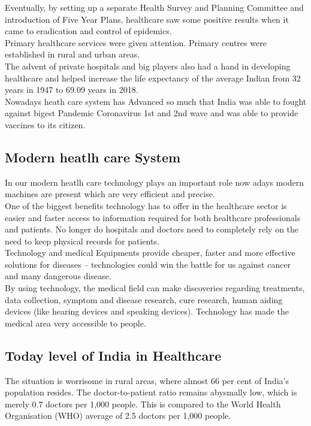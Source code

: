 \documentclass[12pt]{report}
\begin{document}
Eventually, by setting up a separate Health Survey and Planning Committee and introduction of Five Year Plans, healthcare saw some positive results when it came to eradication and control of epidemics.\\
Primary healthcare services were given attention. Primary centres were established in rural and urban areas.\\
The advent of private hospitals and big players also had a hand in developing healthcare and helped increase the life expectancy of the average Indian from 32 years in 1947 to 69.09 years in 2018.\\

Nowadays heath care system has Advanced so much that India was able to fought against bigest Pandemic Coronavirus 1st and 2nd wave and was able to provide vaccines to its citizen.

\clearpage

\subsection{Modern heatlh care System}
In our modern heatlh care technology plays an important role now adays modern machines are present which are very efficient and precise.\\

One of the biggest benefits technology has to offer in the healthcare sector is easier and faster access to information required for both healthcare professionals and patients. No longer do hospitals and doctors need to completely rely on the need to keep physical records for patients.\\

Technology and medical Equipments  provide cheaper, faster and more effective solutions for diseases – technologies could win the battle for us against cancer
and many dangerous disease.\\
By using technology, the medical field can make discoveries regarding treatments, data collection, symptom and disease research, cure research, human aiding devices (like hearing devices and speaking devices). Technology has made the medical area very accessible to people.



\subsection{Today level of India in Healthcare}
The situation is worrisome in rural areas, where almost 66 per cent of India's population resides. The doctor-to-patient ratio remains abysmally low, which is merely 0.7 doctors per 1,000 people. This is compared to the World Health Organisation (WHO) average of 2.5 doctors per 1,000 people.\\
\end{document}
